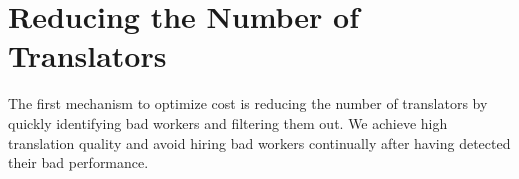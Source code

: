 \documentclass[11pt,letterpaper]{article}
\begin{document}

\section{Reducing the Number of Translators}
The first mechanism to optimize cost is reducing the number of translators by quickly identifying bad workers and filtering them out. We achieve high translation quality and avoid hiring bad workers continually after having detected their bad performance.
\end{document}
